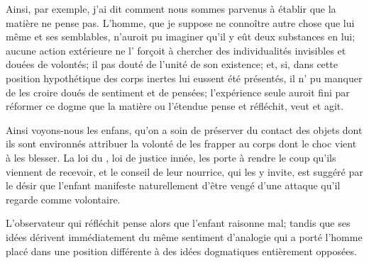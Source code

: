 \documentclass[11pt,a4paper]{article}
\begin{document}
Ainsi, par exemple, j'ai dit comment nous sommes parvenus à établir que
la matière ne pense pas. L'homme, que je suppose ne connoître autre chose
que lui même et ses semblables, n'auroit pu imaginer qu'il y eût deux
substances en lui; aucune action extérieure ne l' forçoit
à chercher des individualités invisibles et douées de volontés;
\struck{\ill{}} il  pas douté 
de l'unité de son existence; et, si, dans cette position hypothétique des
corps inertes lui eussent été présentés, il n'\struck{\ill{}} \ill{} pu
manquer de les croire doués de sentiment et de pensées; l'expérience
seule auroit  fini par réformer ce dogme que la matière
 ou l'étendue pense et réfléchit, veut et agit.

Ainsi voyons-nous les enfans, qu'on a soin de préserver du contact des
objets dont ils sont environnés attribuer la volonté de les frapper au
corps dont le choc vient à les blesser. La loi du ,
loi de justice innée, les porte à rendre le coup qu'ils viennent de
recevoir, et le conseil de leur nourrice, qui les y invite,
 est suggéré par le désir que l'enfant manifeste
naturellement d'être vengé d'une attaque qu'il regarde comme volontaire.

L'observateur qui réfléchit pense alors que l'enfant raisonne mal;
 tandis que ses idées dérivent immédiatement du même
sentiment d'analogie qui a porté l'homme placé dans une position
différente à des idées dogmatiques entièrement opposées.
\end{document}
